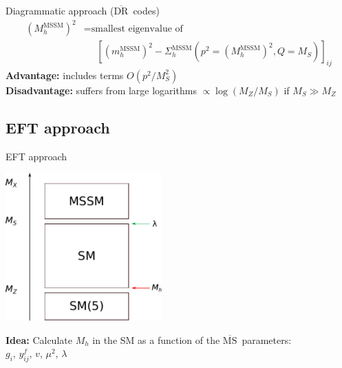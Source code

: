 \documentclass[hyperref={pdfpagelabels=false},ngerman]{beamer}
\renewcommand{\emph}{\textbf}
\newcommand{\DRbar}{\ensuremath{\overline{\text{DR}}}}
\newcommand{\MSbar}{\ensuremath{\overline{\text{MS}}}}
\begin{document}
\begin{frame}{Diagrammatic approach (\DRbar\ codes)}
  \begin{align*}
    (M_h^\text{MSSM})^2 &= \text{smallest eigenvalue of} \\
    &\phantom{={}} \left[(m_h^\text{MSSM})^2 - \Sigma^\text{MSSM}_h(p^2 = (M_h^\text{MSSM})^2,Q = M_S)\right]_{ij}
  \end{align*}
  \emph{Advantage:} includes terms $O(p^2/M_S^2)$\\
  \emph{Disadvantage:} suffers from large logarithms $\propto\log(M_Z/M_S)$ if $M_S\gg M_Z$\\
\end{frame}


\subsection{EFT approach}

\begin{frame}{EFT approach}
  \begin{center}
    \includegraphics[width=0.45\textwidth]{images/mssm-sm-tower-eft}\\[1em]
  \end{center}
  \emph{Idea:} Calculate $M_h$ in the SM as a function of the \MSbar\ parameters:\\[1em]
  \centering $g_i$, $y^f_{ij}$, $v$, $\mu^2$, $\lambda$
\end{frame}
\end{document}

